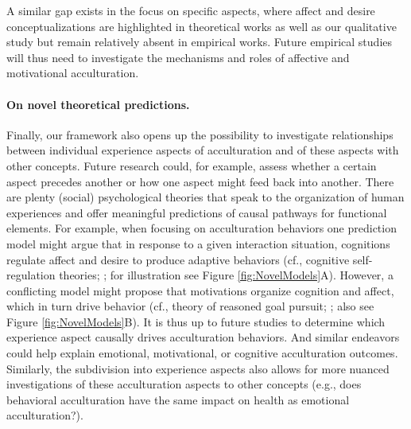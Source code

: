 \documentclass[man, 12pt, a4paper, mask]{apa7}
\begin{document}
A similar gap exists in the focus on specific aspects, where affect and desire conceptualizations are highlighted in theoretical works as well as our qualitative study but remain relatively absent in empirical works. Future empirical studies will thus need to investigate the mechanisms and roles of affective and motivational acculturation.

\paragraph{On novel theoretical predictions.} Finally, our framework also opens up the possibility to investigate relationships between individual experience aspects of acculturation and of these aspects with other concepts. Future research could, for example, assess whether a certain aspect precedes another or how one aspect might feed back into another. There are plenty (social) psychological theories that speak to the organization of human experiences and offer meaningful predictions of causal pathways for functional elements. For example, when focusing on acculturation behaviors one prediction model might argue that in response to a given interaction situation, cognitions regulate affect and desire to produce adaptive behaviors (cf., cognitive self-regulation theories; \citealp{Panadero2017}; for illustration see Figure  \ref{fig:NovelModels}A). However, a conflicting model might propose that motivations organize cognition and affect, which in turn drive behavior (cf., theory of reasoned goal pursuit; \citealp{Ajzen2019}; also see Figure \ref{fig:NovelModels}B). It is thus up to future studies to determine which experience aspect causally drives acculturation behaviors. And similar endeavors could help explain emotional, motivational, or cognitive acculturation outcomes. Similarly, the subdivision into experience aspects also allows for more nuanced investigations of these acculturation aspects to other concepts (e.g., does behavioral acculturation have the same impact on health as emotional acculturation?). 
\end{document}
